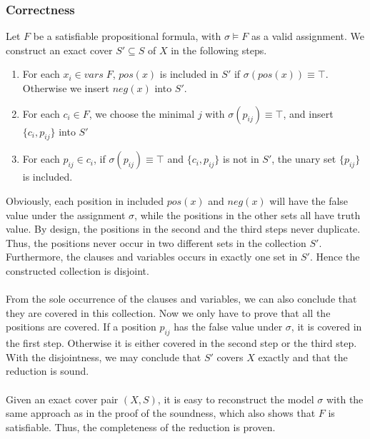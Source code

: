 \subsubsection{Correctness}
Let $F$ be a satisfiable propositional formula, with $\sigma \models F$ as a valid assignment. We construct an exact cover $S' \subseteq S$ of $X$ in the following steps.
\begin{enumerate}
    \item For each $x_i \in vars\; F$, $pos(x)$ is included in $S'$ if $\sigma(pos(x)) \equiv \top$. Otherwise we insert $neg(x)$ into $S'$.
    \item For each $c_i \in F$, we choose the minimal $j$ with $\sigma(p_{ij}) \equiv \top$, and insert $\{c_i, p_{ij}\}$ into $S'$
    \item For each $p_{ij} \in c_i$, if $\sigma(p_{ij}) \equiv \top$ and $\{c_i, p_{ij}\}$ is not in $S'$, the unary set $\{p_{ij}\}$ is included. 
\end{enumerate}
Obviously, each position in included $pos(x)$ and $neg(x)$ will have the false value under the assignment $\sigma$, 
while the positions in the other sets all have truth value. By design, the positions in the second and the third steps never duplicate. 
Thus, the positions never occur in two different sets in the collection $S'$. 
Furthermore, the clauses and variables occurs in exactly one set in $S'$. Hence the constructed collection is disjoint. \\\\
From the sole occurrence of the clauses and variables, we can also conclude that they are covered in this collection. 
Now we only have to prove that all the positions are covered. If a position $p_{ij}$ has the false value under $\sigma$, 
it is covered in the first step. Otherwise it is either covered in the second step or the third step. 
With the disjointness, we may conclude that $S'$ covers $X$ exactly and that the reduction is sound. \\\\
Given an exact cover pair $(X, S)$, it is easy to reconstruct the model $\sigma$ with the same approach as in the proof of the soundness, 
which also shows that $F$ is satisfiable. Thus, the completeness of the reduction is proven. 

